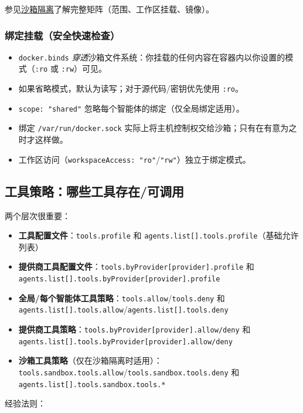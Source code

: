 参见\href{/gateway/sandboxing}{沙箱隔离}了解完整矩阵（范围、工作区挂载、镜像）。

\subsubsection{绑定挂载（安全快速检查）}


\begin{itemize}
  \item \texttt{docker.binds} \textit{穿透}沙箱文件系统：你挂载的任何内容在容器内以你设置的模式（\texttt{:ro} 或 \texttt{:rw}）可见。
  \item 如果省略模式，默认为读写；对于源代码/密钥优先使用 \texttt{:ro}。
  \item \texttt{scope: "shared"} 忽略每个智能体的绑定（仅全局绑定适用）。
  \item 绑定 \texttt{/var/run/docker.sock} 实际上将主机控制权交给沙箱；只有在有意为之时才这样做。
  \item 工作区访问（\texttt{workspaceAccess: "ro"}/\texttt{"rw"}）独立于绑定模式。
\end{itemize}


\subsection{工具策略：哪些工具存在/可调用}


两个层次很重要：

\begin{itemize}
  \item \textbf{工具配置文件}：\texttt{tools.profile} 和 \texttt{agents.list[].tools.profile}（基础允许列表）
  \item \textbf{提供商工具配置文件}：\texttt{tools.byProvider[provider].profile} 和 \texttt{agents.list[].tools.byProvider[provider].profile}
  \item \textbf{全局/每个智能体工具策略}：\texttt{tools.allow}/\texttt{tools.deny} 和 \texttt{agents.list[].tools.allow}/\texttt{agents.list[].tools.deny}
  \item \textbf{提供商工具策略}：\texttt{tools.byProvider[provider].allow/deny} 和 \texttt{agents.list[].tools.byProvider[provider].allow/deny}
  \item \textbf{沙箱工具策略}（仅在沙箱隔离时适用）：\texttt{tools.sandbox.tools.allow}/\texttt{tools.sandbox.tools.deny} 和 \texttt{agents.list[].tools.sandbox.tools.*}
\end{itemize}


经验法则：

